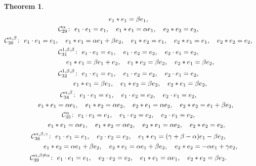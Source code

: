 \documentclass[10pt,a4paper]{amsart}
\numberwithin{equation}{section}
\newtheorem{Theorem}{Theorem}[section]
\begin{document}
\begin{Theorem}
\begin{gather*}
 e_{1}\ast e_{1}=\beta e_{1},
\\
 \mathcal{C}_{29}^{\alpha }\colon\
 e_{1}\cdot e_{1}=e_{1}, \quad
 e_{1}\ast e_{1}=\alpha e_{1}, \quad e_{2}\ast e_{2}=e_{2},
\\
 \mathcal{C}_{30}^{\alpha ,\beta }\colon\
 e_{1}\cdot e_{1}=e_{1}, \quad
 e_{1}\ast e_{1}=\alpha e_{1}+\beta e_{2}, \quad e_{1}\ast e_{2}=e_{1}, \quad
e_{2}\ast e_{1}=e_{1}, \quad
 e_{2}\ast e_{2}=e_{2},
\\
 \mathcal{C}_{31}^{1 ,\beta ,\beta } \colon\
 e_{1}\cdot e_{1}=e_{1}, \quad e_{1}\cdot e_{2}= e_{2}, \quad e_{2}\cdot
e_{1}=e_{2}, \\
\hphantom{\mathcal{C}_{31}^{1 ,\beta ,\beta } \colon} \ e_{1}\ast e_{1}=\beta e_{1}+e_{2}, \quad e_{1}\ast e_{2}=\beta e_{2}, \quad
e_{2}\ast e_{1}=\beta e_{2},
\\
 \mathcal{C}_{32}^{1 ,\beta ,\beta }\colon\
 e_{1}\cdot e_{1}=e_{1}, \quad e_{1}\cdot e_{2}= e_{2}, \quad e_{2}\cdot
e_{1}=e_{2}, \\
\hphantom{\mathcal{C}_{32}^{1 ,\beta ,\beta }\colon} \ e_{1}\ast e_{1}=\beta e_{1}, \quad e_{1}\ast e_{2}=\beta e_{2}, \quad
e_{2}\ast e_{1}=\beta e_{2},
 \\
 \mathcal{C}_{34}^{\alpha ,\beta }\colon\
 e_{1}\cdot e_{1}=e_{1}, \quad e_{1}\cdot e_{2}=e_{2}, \quad e_{2}\cdot
e_{1}=e_{2}, \\
\hphantom{\mathcal{C}_{34}^{\alpha ,\beta }} \ e_{1}\ast e_{1}=\alpha e_{1}, \quad e_{1}\ast e_{2}=\alpha e_{2}, \quad
e_{2}\ast e_{1}=\alpha e_{2}, \quad e_{2}\ast e_{2}=e_{1}+\beta e_{2},
\\
 \mathcal{C}_{35}^{\alpha }\colon\
 e_{1}\cdot e_{1}=e_{1}, \quad e_{1}\cdot e_{2}=e_{2}, \quad e_{2}\cdot
e_{1}=e_{2}, \\
\hphantom{\mathcal{C}_{35}^{\alpha }\colon} \ e_{1}\ast e_{1}=\alpha e_{1}, \quad e_{1}\ast e_{2}=\alpha e_{2}, \quad
e_{2}\ast e_{1}=\alpha e_{2}, \quad e_{2}\ast e_{2}=e_{2},
 \\
 \mathcal{C}_{38}^{\alpha ,\beta ,\gamma }\colon\
 e_{1}\cdot e_{1}=e_{1}, \quad e_{2}\cdot e_{2}=e_{2}, \quad
 e_{1}\ast e_{1}=( \gamma +\beta -\alpha ) e_{1}-\beta e_{2},\\
\hphantom{\mathcal{C}_{38}^{\alpha ,\beta ,\gamma }\colon} \ e_{1}\ast e_{2}=\alpha e_{1}+\beta e_{2}, \quad
 e_{2}\ast e_{1}=\alpha
e_{1}+\beta e_{2}, \quad e_{2}\ast e_{2}=-\alpha e_{1}+\gamma e_{2},
\\
 \mathcal{C}_{39}^{\alpha ,\beta \neq \alpha }\colon\
 e_{1}\cdot e_{1}=e_{1}, \quad e_{2}\cdot e_{2}=e_{2}, \quad
 e_{1}\ast e_{1}=\alpha e_{1}, \quad e_{2}\ast e_{2}=\beta e_{2}.
 \end{gather*}


\end{Theorem}
\end{document}
